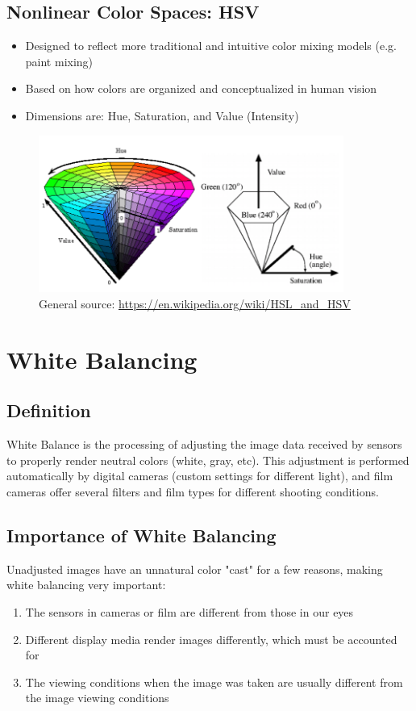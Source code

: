 \documentclass{article}
\begin{document}
\subsection{Nonlinear Color Spaces: HSV}
    \begin{itemize}
	\item Designed to reflect more traditional and intuitive color mixing models (e.g. paint mixing)
    \item Based on how colors are organized and conceptualized in human vision
    \item Dimensions are: Hue, Saturation, and Value (Intensity)

\end{itemize}

    \begin{figure}[h!]
    \centering
    \includegraphics[width=10cm]{hsv1.png}
    \caption{General source: \url{https://en.wikipedia.org/wiki/HSL_and_HSV}}
    \end{figure}


\section{White Balancing}

\subsection{Definition} White Balance is the processing of adjusting the image data received by sensors to properly render neutral colors (white, gray, etc).  This adjustment is performed automatically by digital cameras (custom settings for different light), and film cameras offer several filters and film types for different shooting conditions.

\subsection{Importance of White Balancing} Unadjusted images have an unnatural color "cast" for a few reasons, making white balancing very important:
\begin{enumerate}
\item The sensors in cameras or film are different from those in our eyes
\item Different display media render images differently, which must be accounted for
\item The viewing conditions when the image was taken are usually different from the image viewing conditions
\end{enumerate}
\end{document}
